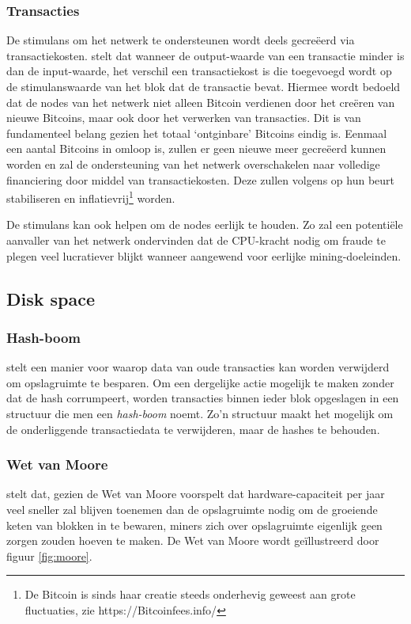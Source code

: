 		\subsubsection{Transacties}
		De stimulans om het netwerk te ondersteunen wordt deels gecreëerd via transactiekosten. \textcite{Nakamoto2008} stelt dat wanneer de output-waarde van een transactie minder is dan de input-waarde, het verschil een transactiekost is die toegevoegd wordt op de stimulanswaarde van het blok dat de transactie bevat. Hiermee wordt bedoeld dat de nodes van het netwerk niet alleen Bitcoin verdienen door het creëren van nieuwe Bitcoins, maar ook door het verwerken van transacties. Dit is van fundamenteel belang gezien het totaal ‘ontginbare’ Bitcoins eindig is. Eenmaal een aantal Bitcoins in omloop is, zullen er geen nieuwe meer gecreëerd kunnen worden en zal de ondersteuning van het netwerk overschakelen naar volledige financiering door middel van transactiekosten. Deze zullen volgens \textcite{Nakamoto2008} op hun beurt stabiliseren en inflatievrij\footnote{De Bitcoin is sinds haar creatie steeds onderhevig geweest aan grote fluctuaties, zie https://Bitcoinfees.info/} worden.
		
		De stimulans kan ook helpen om de nodes eerlijk te houden. Zo zal een potentiële aanvaller van het netwerk ondervinden dat de CPU-kracht nodig om fraude te plegen veel lucratiever blijkt wanneer aangewend voor eerlijke mining-doeleinden. 
		
	\subsection{Disk space}
		\subsubsection{Hash-boom}
		\textcite{Nakamoto2008} stelt  een manier voor waarop data van oude transacties kan worden verwijderd om opslagruimte te besparen. Om een dergelijke actie mogelijk te maken zonder dat de hash corrumpeert, worden transacties binnen ieder blok opgeslagen in een structuur  die men een \textit{hash-boom} noemt. Zo’n structuur maakt het mogelijk om de onderliggende transactiedata te verwijderen, maar de hashes te behouden.
		
		\subsubsection{Wet van Moore}	
		\textcite{Nakamoto2008} stelt dat, gezien de Wet van Moore voorspelt dat hardware-capaciteit per jaar veel sneller zal blijven toenemen dan de opslagruimte nodig om de groeiende keten van blokken in te bewaren, miners zich over opslagruimte eigenlijk geen zorgen zouden hoeven te maken. De Wet van Moore wordt geïllustreerd door figuur \ref{fig:moore}.
		
